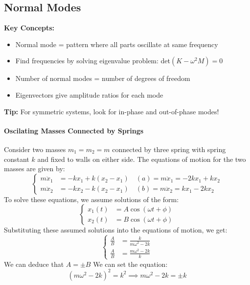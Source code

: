 \documentclass[11pt]{report}
\begin{document}
\subsection{Normal Modes}

\begin{keybox}
\textbf{Key Concepts:}
\begin{itemize}
    \item Normal mode = pattern where all parts oscillate at same frequency
    \item Find frequencies by solving eigenvalue problem: det$(K - \omega^2 M) = 0$
    \item Number of normal modes = number of degrees of freedom
    \item Eigenvectors give amplitude ratios for each mode
\end{itemize}
\textbf{Tip:} For symmetric systems, look for in-phase and out-of-phase modes!
\end{keybox}
\paragraph{Oscilating Masses Connected by Springs} Consider two masses \( m_1 = m_2 = m \) connected by three spring with spring constant \( k \) and fixed to walls on either side. The equations of motion for the two masses are given by:
$$
    \begin{cases}
        m\ddot{x}_1 &= -k x_1 + k (x_2 - x_1) \quad (a) = m\ddot{x}_1 = -2k x_1 + k x_2 \\
        m\ddot{x}_2 &= -k x_2 - k (x_2 - x_1) \quad (b) = m\ddot{x}_2 = k x_1 - 2k x_2
    \end{cases}
$$
To solve these equations, we assume solutions of the form:
$$
    \begin{cases}
        x_1(t) &= A \cos(\omega t + \phi) \\
        x_2(t) &= B \cos(\omega t + \phi)
    \end{cases}
$$
Substituting these assumed solutions into the equations of motion, we get:
\begin{equation} \label{eq:coupled_springs}
    \begin{cases}
        \frac{A}{B} &= \frac{k}{m\omega^2 - 2k} \\
        \frac{A}{B} &= \frac{m\omega^2 - 2k}{k}
    \end{cases}
\end{equation}
We can deduce that $A = \pm B$  
We can set the equation:
$$
    (m\omega^2 - 2k)^2 = k^2 \implies m\omega^2 - 2k = \pm k
$$
\end{document}
